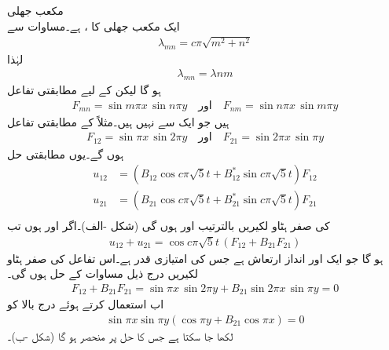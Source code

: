 \quad مکعب جھلی\\
ایک مکعب جھلی کا ،  ہے۔مساوات  سے 
\begin{align}\label{مساوات_جزوی_مثال_مکعب_جھلی_الف}
\lambda_{mn}=c\pi\sqrt{m^2+n^2}
\end{align}
لہٰذا 
\begin{align*}
\lambda_{mn}=\lambda{nm}
\end{align*}
ہو گا لیکن  کے لیے مطابقتی  تفاعل
\begin{align*}
F_{mn}=\sin m\pi x\,\sin n\pi y \quad \text{اور} \quad F_{nm}=\sin n\pi x\,\sin m\pi y
\end{align*}
ہیں جو ایک سے  نہیں ہیں۔مثلاً  کے مطابقتی تفاعل
\begin{align*}
F_{12}=\sin \pi x\,\sin 2\pi y\quad \text{اور}\quad F_{21}=\sin 2\pi x\,\sin \pi y
\end{align*}
ہوں گے۔یوں مطابقتی حل
\begin{align*}
u_{12}&=(B_{12}\cos c\pi\sqrt{5}t+B^*_{12}\sin c\pi\sqrt{5}t)F_{12}\\
u_{21}&=(B_{21}\cos c\pi\sqrt{5}t+B^*_{21}\sin c\pi\sqrt{5}t)F_{21}\\
\end{align*}
کی صفر ہٹاو لکیریں  بالترتیب  اور  ہوں گی (شکل -الف)۔اگر  اور  ہوں تب
\begin{align}\label{مساوات_جزوی_ایک_بی_کے_حل}
u_{12}+u_{21}=\cos c\pi\sqrt{5}t\,(F_{12}+B_{21}F_{21})
\end{align}
ہو گا جو ایک اور انداز ارتعاش ہے جس کی امتیازی قدر  ہے۔اس تفاعل کی صفر ہٹاو لکیریں درج ذیل مساوات کے حل ہوں گی۔
\begin{align*}
F_{12}+B_{21}F_{21}=\sin \pi x\,\sin 2\pi y+B_{21}\sin 2\pi x\,\sin \pi y=0
\end{align*}
اب  استعمال کرتے ہوئے درج بالا کو 
\begin{align}
\sin \pi x\sin \pi y(\cos \pi y+B_{21}\cos \pi x)=0
\end{align}
لکھا جا سکتا ہے جس کا حل  پر منحصر ہو گا (شکل -ب)۔

